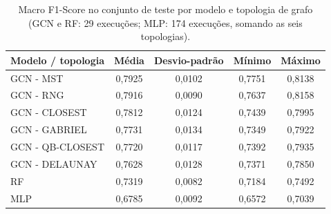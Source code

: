 \begin{table}[htbp]
    \centering
    \caption{Macro F1-Score no conjunto de teste por modelo e topologia de grafo (GCN e RF: 29 execu\c{c}\~oes; MLP: 174 execu\c{c}\~oes, somando as seis topologias).}
    \label{tab:resultados_f1}
    \begin{tabular}{lcccc}
        \hline
        Modelo / topologia & M\'edia & Desvio-padr\~ao & M\'inimo & M\'aximo \\
        \hline
        GCN - MST & 0,7925 & 0,0102 & 0,7751 & 0,8138 \\
        GCN - RNG & 0,7916 & 0,0090 & 0,7637 & 0,8158 \\
        GCN - CLOSEST & 0,7812 & 0,0124 & 0,7439 & 0,7995 \\
        GCN - GABRIEL & 0,7731 & 0,0134 & 0,7349 & 0,7922 \\
        GCN - QB-CLOSEST & 0,7720 & 0,0117 & 0,7392 & 0,7935 \\
        GCN - DELAUNAY & 0,7628 & 0,0128 & 0,7371 & 0,7850 \\
        RF & 0,7319 & 0,0082 & 0,7184 & 0,7492 \\
        MLP & 0,6785 & 0,0092 & 0,6572 & 0,7039 \\
        \hline
    \end{tabular}
\end{table}
